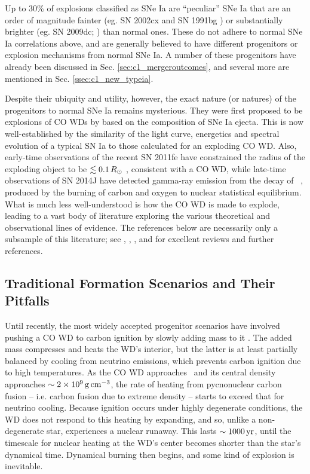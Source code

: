 
Up to $30$\% \citep{li+11} of explosions classified as SNe Ia are ``peculiar'' SNe Ia that are an order of magnitude fainter (eg. SN 2002cx \citep{li+02, fole+13} and SN 1991bg \citep{mazz+97}) or substantially brighter (eg. SN 2009dc; \citealt{yama+09, taub+09}) than normal ones.  These do not adhere to normal SNe Ia correlations above, and are generally believed to have different progenitors or explosion mechanisms from normal SNe Ia.  A number of these progenitors have already been discussed in Sec. \ref{sec:c1_mergeroutcomes}, and several more are mentioned in Sec. \ref{ssec:c1_new_typeia}.

Despite their ubiquity and utility, however, the exact nature (or natures) of the progenitors to normal SNe Ia remains mysterious.  They were first proposed to be explosions of CO WDs by \cite{hoylf60} based on the composition of SNe Ia ejecta.  This is now well-established by the similarity of the light curve, energetics and spectral evolution of a typical SN Ia to those calculated for an exploding CO WD.  Also, early-time observations of the recent SN 2011fe have constrained the radius of the exploding object to be $\lesssim0.1\,\Rsun$ \citep{nuge+11, bloo+12,maozmn14}, consistent with a CO WD, while late-time observations of SN 2014J have detected gamma-ray emission from the decay of \Ni\ \citep{chur+14}, produced by the burning of carbon and oxygen to nuclear statistical equilibrium.  What is much less well-understood is how the CO WD is made to explode, leading to a vast body of literature exploring the various theoretical and observational lines of evidence.  The references below are necessarily only a subsample of this literature; see \cite{howe11}, \cite{hill+13}, \cite{maozmn14}, and \cite{tsebs15} for excellent reviews and further references.

\subsection{Traditional Formation Scenarios and Their Pitfalls}
\label{ssec:c1_old_typeia}

Until recently, the most widely accepted progenitor scenarios have involved pushing a CO WD to carbon ignition by slowly adding mass to it \citep{hilln00}.  The added mass compresses and heats the WD's interior, but the latter is at least partially balanced by cooling from neutrino emissions, which prevents carbon ignition due to high temperatures.  As the CO WD approaches \Mch\ and its central density approaches $\sim2\times10^9\,\gcc$, the rate of heating from pycnonuclear carbon fusion -- i.e. carbon fusion due to extreme density -- starts to exceed that for neutrino cooling.  Because ignition occurs under highly degenerate conditions, the WD does not respond to this heating by expanding, and so, unlike a non-degenerate star, experiences a nuclear runaway.  This lasts $\sim1000\,\mathrm{yr}$, until the timescale for nuclear heating at the WD's center becomes shorter than the star's dynamical time.  Dynamical burning then begins, and some kind of explosion is inevitable.

